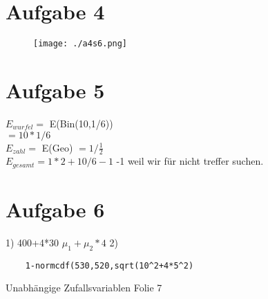 \documentclass[a4paper,10pt]{scrbook}
\begin{document}
\section*{Aufgabe 4}
\begin{figure}[h]
 \centering
 \texttt{[image: ./a4s6.png]}
\end{figure}

\section*{Aufgabe 5}
$ E_{wurfel} =$ E(Bin(10,1/6))  \\
$ = 10*1/6$ \\
$ E_{zahl} = $ E(Geo) $ = 1/\frac{1}{2}$ \\
$E_{gesamt} = 1*2 + 10/6 -1 $ -1 weil wir für nicht treffer suchen.


\section*{Aufgabe 6}

1) 400+4*30 $\mu_1 + \mu_2*4$
2) \begin{verbatim}
    1-normcdf(530,520,sqrt(10^2+4*5^2)
   \end{verbatim}
   Unabhängige Zufallsvariablen  Folie 7
\end{document}
